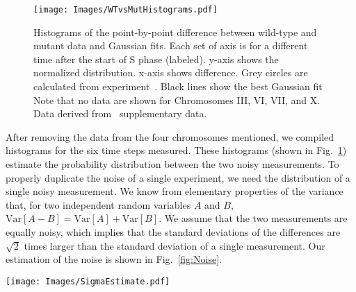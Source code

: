 		\begin{figure}[tbh]
			\begin{center}
				\texttt{[image: Images/WTvsMutHistograms.pdf]}
			\end{center}
				\caption[Estimating Experimental Noise B]{\label{fig:HistDifference} Histograms of the point-by-point difference between wild-type and mutant data and Gaussian fits.
					Each set of axis is for a different time after the start of S phase (labeled).
					y-axis shows the normalized distribution.
					x-axis shows difference.
					Grey circles are calculated from experiment~\cite{StochasticTermination}.
					Black lines show the best Gaussian fit
					Note that no data are shown for Chromosomes III, VI, VII, and X.
					Data derived from~\cite{StochasticTermination} supplementary data.
				}
		\end{figure}
		
		After removing the data from the four chromosomes mentioned, we compiled histograms for the six time steps measured.
		These histograms (shown in Fig.~\ref{fig:HistDifference}) estimate the probability distribution between the two noisy measurements.
		To properly duplicate the noise of a single experiment, we need the distribution of a single noisy measurement.
		We know from elementary properties of the variance that, for two independent random variables $A$ and $B$, $\text{Var}[A-B] = \text{Var}[A] + \text{Var}[B]$.
		We assume that the two measurements are equally noisy, which implies that the standard deviations of the differences are $\sqrt{2}$ times larger than the standard deviation of a single measurement.
		Our estimation of the noise is shown in Fig.~\ref{fig:Noise}.
		
		\begin{SCfigure}[1][tbh]
			\texttt{[image: Images/SigmaEstimate.pdf]}
			\caption[Estimated Simulation and Experimental Noise]{\label{fig:Noise} 
				Scatter plot of estimated $\sigma$ vs time since the start of S phase for experimental data and simulation data.
				Open circles show experimental estimates.
				Black circles show simulation estimates.
				Crosses show calculated values for $\sigma_\text{add}$ (Eq.~\ref{eq:AddingNoise})
				dots show estimates from simulations with added Gaussian noise.
			}
		\end{SCfigure}
		
